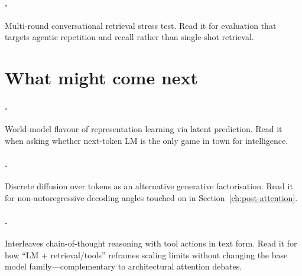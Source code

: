 \paragraph{\citet{chen2025mrcr}.}
Multi-round conversational retrieval stress test. Read it for evaluation that
targets agentic repetition and recall rather than single-shot retrieval.

\section*{What might come next}

\paragraph{\citet{lecun2022jepa}.}
World-model flavour of representation learning via latent prediction. Read it
when asking whether next-token LM is the only game in town for intelligence.

\paragraph{\citet{lou2024discrete}.}
Discrete diffusion over tokens as an alternative generative factorisation. Read
it for non-autoregressive decoding angles touched on in Section~\ref{ch:post-attention}.

\paragraph{\citet{yao2023react}.}
Interleaves chain-of-thought reasoning with tool actions in text form. Read it
for how ``LM + retrieval/tools'' reframes scaling limits without changing the
base model family---complementary to architectural attention debates.
